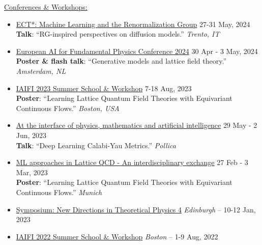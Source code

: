 \documentclass[11pt]{article}
\newcommand{\dateright}[1]{\hfill{\small\color{accentblue} #1}}
\begin{document}
\underline{Conferences \& Workshops:}

\begin{itemize}[resume, itemsep=3.5pt]
    \item {\href{https://indico.ectstar.eu/event/206/contributions/4799/}{ECT*: Machine Learning and the Renormalization Group}} \dateright{ 27-31 May, 2024} \\
    {\footnotesize \textbf{Talk}: “RG-inspired perspectives on diffusion models.”} \dateright{{\color{black}\textit{Trento, IT}}}

    \item {\href{https://indico.nikhef.nl/event/4875/contributions/20373/}{European AI for Fundamental Physics Conference 2024}} \dateright{ 30 Apr - 3 May, 2024} \\
    {\footnotesize \textbf{Poster \& flash talk}: “Generative models and lattice field theory.”} \dateright{{\color{black}\textit{Amsterdam, NL}}}

    \item {\href{https://iaifi.org/past-workshops.html}{IAIFI 2023 Summer School \& Workshop}} \dateright{ 7-18 Aug, 2023} \\
    {\footnotesize \textbf{Poster}: “Learning Lattice Quantum Field Theories with Equivariant Continuous Flows.”} \dateright{{\color{black}\textit{Boston, USA}}}

    \item {\href{https://agenda.infn.it/event/33851/}{At the interface of physics, mathematics and artificial intelligence}} \dateright{ 29 May - 2 Jun, 2023} \\
    {\footnotesize \textbf{Talk}: “Deep Learning Calabi-Yau Metrics.”} \dateright{{\color{black}\textit{Pollica}}}

    \item {\href{https://indico.ph.tum.de/event/7116/}{ML approaches in Lattice QCD - An interdisciplinary exchange}} \dateright{ 27 Feb - 3 Mar, 2023} \\
    {\footnotesize \textbf{Poster}: “Learning Lattice Quantum Field Theories with Equivariant Continuous Flows.”} \dateright{{\color{black}\textit{Munich}}}

    \item {\href{https://indico.ph.ed.ac.uk/event/124/}{Symposium: New Directions in Theoretical Physics 4}} \dateright{{\color{black}\textit{Edinburgh} -- } 10-12 Jan, 2023}

    \item {\href{https://iaifi.org/past-workshops.html}{IAIFI 2022 Summer School \& Workshop}} \dateright{{\color{black}\textit{Boston} --} 1-9 Aug, 2022}


\end{itemize}
\end{document}
